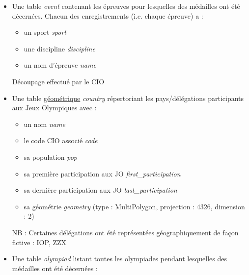 \documentclass{article}
\begin{document}
\begin{itemize}

\item
Une table \textit{event} contenant les épreuves pour lesquelles des médailles ont été décernées. Chacun des enregistrements (i.e. chaque épreuve) a :

\begin{itemize}

\item un sport \textit{sport}

\item une discipline \textit{discipline}

\item un nom d'épreuve \textit{name}

\end{itemize}

{\footnotesize Découpage effectué par le CIO}

\item
Une table \underline{géométrique} \textit{country} répertoriant les pays/délégations participants aux Jeux Olympiques avec :

\begin{itemize}

\item un nom \textit{name}

\item le code CIO associé \textit{code}

\item sa population \textit{pop}

\item sa première participation aux JO \textit{first\_participation}

\item sa dernière participation aux JO \textit{last\_participation}

\item sa géométrie \textit{geometry} {\footnotesize (type : MultiPolygon, projection : 4326, dimension : 2) }

\end{itemize}

{\footnotesize NB : Certaines délégations ont été représentées géographiquement de façon fictive : IOP, ZZX}

\item
Une table \textit{olympiad} listant toutes les olympiades pendant lesquelles des médailles ont été décernées :

\begin{itemize}


\end{itemize}
\end{itemize}
\end{document}
